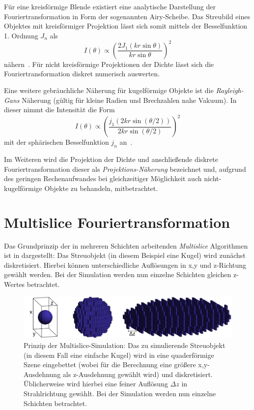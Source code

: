 Für eine kreisförmige Blende existiert eine analytische Darstellung der Fouriertransformation in Form der sogenannten Airy-Scheibe. Das Streubild eines Objektes mit kreisförmiger Projektion lässt sich somit mittels der Besselfunktion 1. Ordnung $J_n$ als
\begin{equation}
	I(\theta) \propto \left ( \frac{2 J_1(kr \sin \theta)}{kr \sin \theta} \right )^2 
\end{equation}
nähern~\cite{born1980}. Für nicht kreisförmige Projektionen der Dichte lässt sich die Fouriertransformation diskret numerisch auswerten.

Eine weitere gebräuchliche Näherung für kugelförmige Objekte ist die \textit{Rayleigh-Gans} Näherung (gültig für kleine Radien und Brechzahlen nahe Vakuum). In dieser nimmt die Intensität die Form
\begin{equation}
	I(\theta)\propto\left ( \frac{j_1(2kr\sin(\theta/2))}{2kr\sin(\theta/2)} \right )^2 
\end{equation}
mit der sphärischen Besselfunktion $j_n$ an~\cite{bohren2008}. 

Im Weiteren wird die Projektion der Dichte und anschließende diskrete Fouriertransformation dieser als \textit{Projektions-Näherung} bezeichnet und, aufgrund des geringen Rechenaufwandes bei gleichzeitiger Möglichkeit auch nicht-kugelförmige Objekte zu behandeln, mitbetrachtet.


\section{Multislice Fouriertransformation}
Das Grundprinzip der in mehreren Schichten arbeitenden \textit{Multislice} Algorithmen ist in  dargestellt: Das Streuobjekt (in diesem Beispiel eine Kugel) wird zunächst diskretisiert. Hierbei können unterschiedliche Auflösungen in x,y und z-Richtung gewählt werden. Bei der Simulation werden nun einzelne Schichten gleichen z-Wertes betrachtet.
\begin{figure}
	\centering
	\includegraphics[width=1\textwidth]{images/multislice_sphere.png}
	\caption[Prinzip Multislice]{Prinzip der Multislice-Simulation: Das zu simulierende Streuobjekt (in diesem Fall eine einfache Kugel) wird in eine quaderförmige Szene eingebettet (wobei für die Berechnung eine größere x,y-Ausdehnung als z-Ausdehnung gewählt wird) und diskretisiert. Üblicherweise wird hierbei eine feiner Auflösung $\Delta z$ in Strahlrichtung gewählt. Bei der Simulation werden nun einzelne Schichten betrachtet.}
	\label{fig:multislice_prinzip}
\end{figure} 


